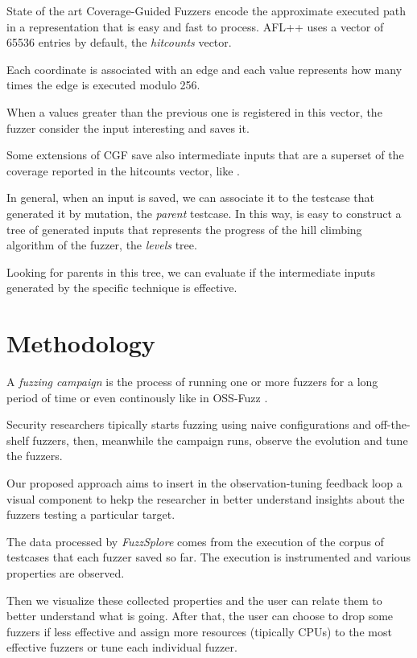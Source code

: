 \documentclass[conference,compsoc]{IEEEtran}
\begin{document}
State of the art Coverage-Guided Fuzzers encode the approximate executed path in a representation that is easy and fast to process.
{\sc AFL++} uses a vector of 65536 entries by default, the {\it hitcounts} vector.

Each coordinate is associated with an edge and each value represents how many times the edge is executed modulo 256.

When a values greater than the previous one is registered in this vector, the fuzzer consider the input interesting and saves it.

Some extensions of CGF save also intermediate inputs that are a superset of the coverage reported in the hitcounts vector, like \cite{lafintel} \cite{ijon} \cite{besensitive}.

In general, when an input is saved, we can associate it to the testcase that generated it by mutation, the {\it parent} testcase. In this way, is easy to construct a tree of generated inputs that represents the progress of the hill climbing algorithm of the fuzzer, the {\it levels} tree.

Looking for parents in this tree, we can evaluate if the intermediate inputs generated by the specific technique is effective.

\section{Methodology}

A {\em fuzzing campaign} is the process of running one or more fuzzers for a long period of time or even continously like in OSS-Fuzz \cite{serebryany2017oss}.

Security researchers tipically starts fuzzing using naive configurations and off-the-shelf fuzzers, then, meanwhile the campaign runs, observe the evolution and tune the fuzzers.

Our proposed approach aims to insert in the observation-tuning feedback loop a visual component to hekp the researcher in better understand insights about the fuzzers testing a particular target.

The data processed by {\em FuzzSplore} comes from the execution of the corpus of testcases that each fuzzer saved so far. The execution is instrumented and various properties are observed.

Then we visualize these collected properties and the user can relate them to better understand what is going. After that, the user can choose to drop some fuzzers if less effective and assign more resources (tipically CPUs) to the most effective fuzzers or tune each individual fuzzer.
\end{document}
